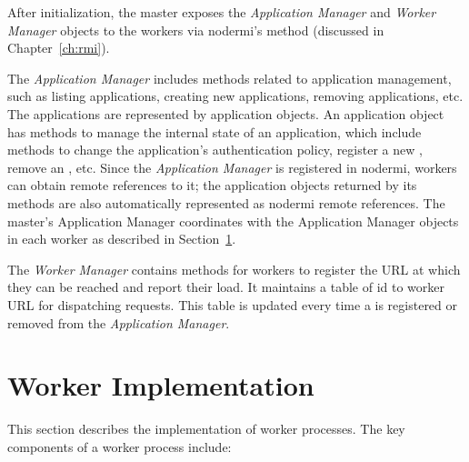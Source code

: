 After initialization, the master exposes the \emph{Application Manager} and
\emph{Worker Manager} objects to the workers via nodermi's  method
(discussed in Chapter~\ref{ch:rmi}).

The \emph{Application Manager} includes methods related to application management,
such as listing applications, creating new applications, removing applications,
etc.  The applications are represented by application objects. An application
object has methods to manage the internal state of an application, which include
methods to change the application's authentication policy, register a new \appins, 
remove an \appins, etc.  Since the \emph{Application Manager} is registered in nodermi,
workers can obtain remote references to it; the application objects returned by its
methods are also automatically represented as nodermi remote references.
The master's Application Manager coordinates with the Application Manager
objects in each worker as described in Section~\ref{sec:worker}.

The \emph{Worker Manager} contains methods for workers to register the URL at which
they can be reached and report their load.  It maintains a table of \appins{} id to
worker URL for dispatching requests.  This table is updated
every time a \appins{} is registered or removed from the \emph{Application
Manager}.

\section{Worker Implementation}
\label{sec:worker}

This section describes the implementation of worker processes.
The key components of a worker process include:

